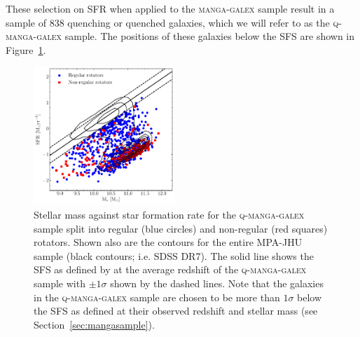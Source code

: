 \documentclass[useAMS,usenatbib]{mn2e}
\begin{document}

These selection on SFR when applied to the \textsc{manga-galex} sample result in a sample of $838$ quenching or quenched galaxies, which we will refer to as the \textsc{q-manga-galex} sample. The positions of these galaxies below the SFS are shown in Figure~\ref{fig:masvsfr}. 

\begin{figure}
\centering
\includegraphics[width=0.475\textwidth]{../figures/nonSF_FR_SR_SFS_scatter.pdf}
\caption{Stellar mass against star formation rate for the \textsc{q-manga-galex} sample split into regular (blue circles) and non-regular (red squares) rotators. Shown also are the contours for the entire MPA-JHU sample (black contours; i.e. SDSS DR7). The solid line shows the SFS as defined by \cite{peng10} at the average redshift of the \textsc{q-manga-galex} sample with $\pm 1 \sigma$ shown by the dashed lines. Note that the galaxies in the \textsc{q-manga-galex} sample are chosen to be more than $1\sigma$ below the SFS as defined at their observed redshift and stellar mass (see Section~\ref{sec:mangasample}).}
\label{fig:masvsfr}
\end{figure}
\end{document}
